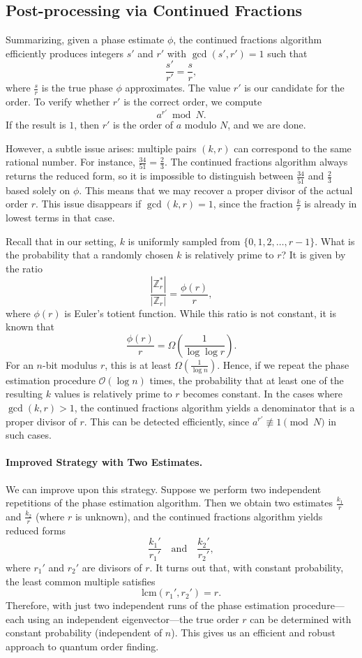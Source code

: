 \subsection{Post-processing via Continued Fractions}

Summarizing, given a phase estimate $\phi$, the continued fractions algorithm efficiently produces integers $s'$ and $r'$ with $\gcd(s', r') = 1$ such that
\[
\frac{s'}{r'} = \frac{s}{r},
\]
where $\frac{s}{r}$ is the true phase $\phi$ approximates. The value $r'$ is our candidate for the order. To verify whether $r'$ is the correct order, we compute
\[
a^{r'} \bmod N.
\]
If the result is $1$, then $r'$ is the order of $a$ modulo $N$, and we are done.

However, a subtle issue arises: multiple pairs $(k, r)$ can correspond to the same rational number. For instance, $\frac{34}{51} = \frac{2}{3}$. The continued fractions algorithm always returns the reduced form, so it is impossible to distinguish between $\frac{34}{51}$ and $\frac{2}{3}$ based solely on $\phi$. This means that we may recover a proper divisor of the actual order $r$. This issue disappears if $\gcd(k, r) = 1$, since the fraction $\frac{k}{r}$ is already in lowest terms in that case.

Recall that in our setting, $k$ is uniformly sampled from $\{0, 1, 2, \ldots, r - 1\}$. What is the probability that a randomly chosen $k$ is relatively prime to $r$? It is given by the ratio
\[
\frac{|\mathbb{Z}_r^*|}{|\mathbb{Z}_r|} = \frac{\phi(r)}{r},
\]
where $\phi(r)$ is Euler's totient function. While this ratio is not constant, it is known that
\[
\frac{\phi(r)}{r} = \Omega\left(\frac{1}{\log \log r}\right).
\]
For an $n$-bit modulus $r$, this is at least $\Omega\left(\frac{1}{\log n}\right)$. Hence, if we repeat the phase estimation procedure $\mathcal{O}(\log n)$ times, the probability that at least one of the resulting $k$ values is relatively prime to $r$ becomes constant. In the cases where $\gcd(k, r) > 1$, the continued fractions algorithm yields a denominator that is a proper divisor of $r$. This can be detected efficiently, since $a^{r'} \not\equiv 1 \pmod{N}$ in such cases.

\paragraph{Improved Strategy with Two Estimates.}

We can improve upon this strategy. Suppose we perform two independent repetitions of the phase estimation algorithm. Then we obtain two estimates $\frac{k_1}{r}$ and $\frac{k_2}{r}$ (where $r$ is unknown), and the continued fractions algorithm yields reduced forms
\[
\frac{k_1'}{r_1'} \quad \text{and} \quad \frac{k_2'}{r_2'},
\]
where $r_1'$ and $r_2'$ are divisors of $r$. It turns out that, with constant probability, the least common multiple satisfies
\[
\mathrm{lcm}(r_1', r_2') = r.
\]
Therefore, with just two independent runs of the phase estimation procedure—each using an independent eigenvector—the true order $r$ can be determined with constant probability (independent of $n$). This gives us an efficient and robust approach to quantum order finding.

